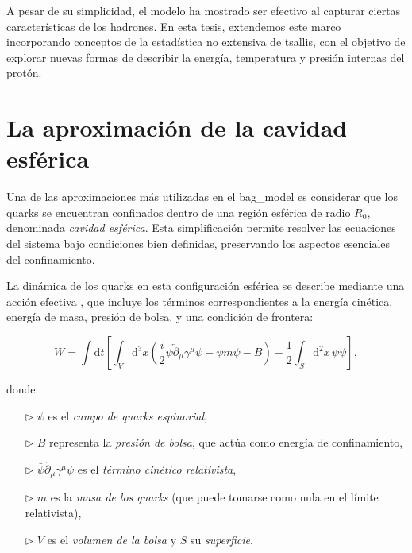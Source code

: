 A pesar de su simplicidad, el modelo ha mostrado ser efectivo al capturar ciertas características de los hadrones. En esta tesis, extendemos este marco incorporando conceptos de la estadística no extensiva de \gls{tsallis}, con el objetivo de explorar nuevas formas de describir la energía, temperatura y presión internas del protón.

\section{La aproximación de la cavidad esférica}

Una de las aproximaciones más utilizadas en el \gls{bag_model} es considerar que los quarks se encuentran confinados dentro de una región esférica de radio $R_0$, denominada \emph{cavidad esférica}. Esta simplificación permite resolver las ecuaciones del sistema bajo condiciones bien definidas, preservando los aspectos esenciales del confinamiento.

La dinámica de los quarks en esta configuración esférica se describe mediante una acción efectiva \cite{Chodos_1974}, que incluye los términos correspondientes a la energía cinética, energía de masa, presión de bolsa, y una condición de frontera:

\begin{equation} \label{eq:bag-action}
W = \int \! \mathrm{d}t \left[ \int_V \! \mathrm{d}^3x \left( \frac{i}{2} \bar{\psi} \overleftrightarrow{\partial}_{\mu} \gamma^\mu \psi - \bar{\psi} m \psi - B \right) - \frac{1}{2} \int_S \! \mathrm{d}^2x \, \bar{\psi} \psi \right],
\end{equation}

donde:
\begin{enumerate}
    \item[$\triangleright$] $\psi$ es el \emph{campo de quarks espinorial},
    \item[$\triangleright$] $B$ representa la \emph{presión de bolsa}, que actúa como energía de confinamiento,
    \item[$\triangleright$] $\bar{\psi} \overleftrightarrow{\partial}_{\mu} \gamma^\mu \psi$ es el \emph{término cinético relativista},
    \item[$\triangleright$] $m$ es la \emph{masa de los quarks} (que puede tomarse como nula en el límite relativista),
    \item[$\triangleright$] $V$ es el \emph{volumen de la bolsa} y $S$ su \emph{superficie}.
\end{enumerate}

